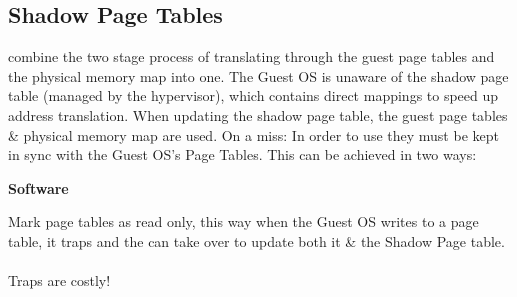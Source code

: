 \documentclass{report}
\begin{document}
        \subsection*{Shadow Page Tables}
             combine the two stage process of translating through the guest page tables and the physical memory map into one. The Guest OS is unaware of the shadow page table (managed by the hypervisor), which contains direct mappings to speed up address translation. When updating the shadow page table, the guest page tables \& physical memory map are used.
            On a  miss:
            In order to use  they must be kept in sync with the Guest OS's Page Tables. This can be achieved in two ways:
            \\ \begin{minipage}[t]{0.45\textwidth}
                \centerline{\textbf{Software}}
                Mark page tables as read only, this way when the Guest OS writes
                to a page table, it traps and the  can take over to update both it \& the Shadow Page table.
                \\
                \\ Traps are costly!
            \end{minipage}
            \hfill
\end{document}
